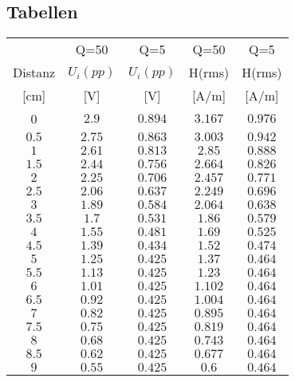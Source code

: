 \documentclass[12pt,a4paper,ngerman]{article}
\begin{document}
\subsection{Tabellen}
\begin{table}[H]
\begin{center}
\begin{tabular}{ |c|c|c|c|c| }
  \hline
     & Q=50 & Q=5 & Q=50 & Q=5\\

    Distanz & $U_i(pp)$ & $U_i(pp)$ & H(rms) & H(rms)\\

  [cm] & [V] & [V] & [A/m] & [A/m] \\
  \hline
  0 & $2.9$ & $0.894$ & $3.167$ & $0.976$ \\
  \hline
  $0.5$ & $2.75$ & $0.863$ & $3.003$ & $0.942$ \\
  \hline
  $1$ & $2.61$ & $0.813$ & $2.85$ & $0.888$ \\
  \hline
  $1.5$ & $2.44$ & $0.756$ & $2.664$ & $0.826$ \\
    \hline
  $2$ & $2.25$ & $0.706$ & $2.457$ & $0.771$ \\
    \hline
  $2.5$ & $2.06$ & $0.637$ & $2.249$ & $0.696$ \\
    \hline
  $3$ & $1.89$ & $0.584$ & $2.064$ & $0.638$ \\
    \hline
  $3.5$ & $1.7$ & $0.531$ & $1.86$ & $0.579$\\
    \hline
  $4$ & $1.55$ & $0.481$ & $1.69$ & $0.525$ \\
    \hline
  $4.5$ & $1.39$ & $0.434$ & $1.52$ & $0.474$ \\
    \hline
  $5$ & $1.25$ & $0.425$ & $1.37$ & $0.464$ \\
    \hline
  $5.5$ & $1.13$ & $0.425$ & $1.23$ & $0.464$ \\
     \hline
  $6$ & $1.01$ & $0.425$ & $1.102$ & $0.464$ \\
      \hline
  $6.5$ & $0.92$ & $0.425$ & $1.004$ & $0.464$ \\ 
      \hline
  $7$ & $0.82$ & $0.425$ & $0.895$ & $0.464$ \\
      \hline
  $7.5$ & $0.75$ & $0.425$ & $0.819$ & $0.464$ \\
      \hline
  $8$ & $0.68$ & $0.425$ & $0.743$ & $0.464$ \\
      \hline
  $8.5$ & $0.62$ & $0.425$ & $0.677$ & $0.464$ \\
      \hline
  $9$ & $0.55$ & $0.425$ & $0.6$ & $0.464$ \\
      \hline

\end{tabular}
\end{center}
\end{table}
\end{document}
